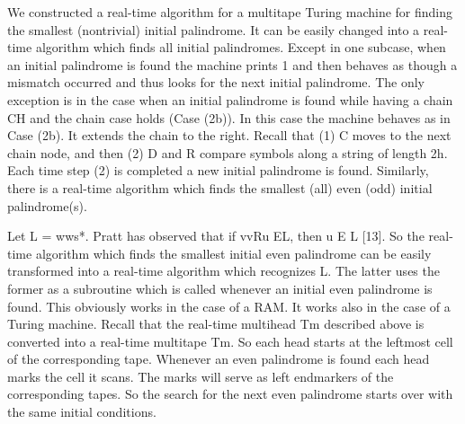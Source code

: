 \documentclass[11pt,a4paper]{report}
\begin{document}
We constructed a real-time algorithm for a multitape Turing machine for finding the
smallest (nontrivial) initial palindrome. It can be easily changed into a real-time algorithm
which finds all initial palindromes. Except in one subcase, when an initial palindrome is
found the machine prints 1 and then behaves as though a mismatch occurred and thus
looks for the next initial palindrome. The only exception is in the case when an initial
palindrome is found while having a chain CH and the chain case holds (Case (2b)).
In this case the machine behaves as in Case (2b). It extends the chain to the right. Recall
that (1) C moves to the next chain node, and then (2) D and R compare symbols along a
string of length 2h. Each time step (2) is completed a new initial palindrome is found.
Similarly, there is a real-time algorithm which finds the smallest (all) even (odd) initial
palindrome(s).

Let L = {wws}*. Pratt has observed that if vvRu EL, then u E L [13]. So the real-time
algorithm which finds the smallest initial even palindrome can be easily transformed into
a real-time algorithm which recognizes L. The latter uses the former as a subroutine 
which is called whenever an initial even palindrome is found. This obviously works in
the case of a RAM. It works also in the case of a Turing machine. Recall that the real-time
multihead Tm described above is converted into a real-time multitape Tm. So each
head starts at the leftmost cell of the corresponding tape. Whenever an even palindrome is
found each head marks the cell it scans. The marks will serve as left endmarkers of the
corresponding tapes. So the search for the next even palindrome starts over with the same
initial conditions. 


\end{document}
